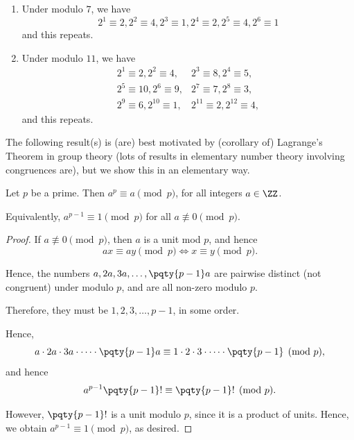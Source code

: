 \begin{examples}
    \begin{enumerate}
        \item Under modulo \(7\), we have
        \[
            2^1 \equiv 2, 2^2 \equiv 4, 2^3 \equiv 1, 2^4 \equiv 2, 2^5 \equiv 4, 2^6 \equiv 1
        \]
        and this repeats.

        \item Under modulo \(11\), we have
        \begin{align*}
            2^1 \equiv 2, 2^2 \equiv 4, & 2^3 \equiv 8, 2^4 \equiv 5, \\
            2^5 \equiv 10, 2^6 \equiv 9, & 2^7 \equiv 7, 2^8 \equiv 3, \\
            2^9 \equiv 6, 2^{10} \equiv 1, & 2^{11} \equiv 2, 2^{12} \equiv 4,
        \end{align*}
        and this repeats.
    \end{enumerate}
\end{examples}

The following result(s) is (are) best motivated by (corollary of) Lagrange's Theorem in group theory (lots of results in elementary number theory involving congruences are), but we show this in an elementary way.

\begin{theorem}
    Let \(p\) be a prime. Then \(a^p \equiv a \pmod{p}\), for all integers \(a \in \ZZ\).

    Equivalently, \(a^{p - 1} \equiv 1 \pmod{p}\) for all \(a \nequiv 0 \pmod{p}\).
\end{theorem}

\begin{proof}
    If \(a \nequiv 0 \pmod{p}\), then \(a\) is a unit mod \(p\), and hence
    \[
        ax \equiv ay \pmod{p} \iff x \equiv y \pmod{p}.
    \]

    Hence, the numbers \(a, 2a, 3a, \ldots, \pqty{p - 1}a\) are pairwise distinct (not congruent) under modulo \(p\), and are all non-zero modulo \(p\).

    Therefore, they must be \(1, 2, 3, \ldots, p - 1\), in some order.

    Hence,
    \[
        a \cdot 2a \cdot 3a \cdot \cdots \cdot \pqty{p - 1} a \equiv 1 \cdot 2 \cdot 3 \cdot \cdots \cdot \pqty{p - 1} \pmod{p},
    \]
    and hence
    \[
        a^{p - 1} \pqty{p - 1}! \equiv \pqty{p - 1}! \pmod{p}.
    \]

    However, \(\pqty{p - 1}!\) is a unit modulo \(p\), since it is a product of units. Hence, we obtain \(a^{p - 1} \equiv 1 \pmod{p}\), as desired.
\end{proof}

